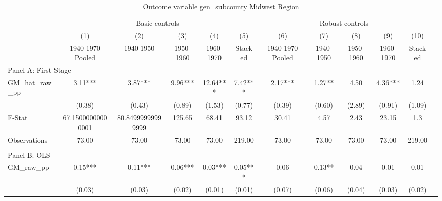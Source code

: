 \begin{table}[htbp]\centering {} \begin{threeparttable} \caption{Outcome variable gen\_subcounty Midwest Region} \begin{tabular}{l*{11}{c}} \toprule
          &\multicolumn{5}{c}{Basic controls}                                   &\multicolumn{5}{c}{Robust controls}                                  \\\cmidrule(lr){2-6}\cmidrule(lr){7-11}
          &\multicolumn{1}{c}{(1)}&\multicolumn{1}{c}{(2)}&\multicolumn{1}{c}{(3)}&\multicolumn{1}{c}{(4)}&\multicolumn{1}{c}{(5)}&\multicolumn{1}{c}{(6)}&\multicolumn{1}{c}{(7)}&\multicolumn{1}{c}{(8)}&\multicolumn{1}{c}{(9)}&\multicolumn{1}{c}{(10)}\\
          &\multicolumn{1}{c}{1940-1970 Pooled}&\multicolumn{1}{c}{1940-1950}&\multicolumn{1}{c}{1950-1960}&\multicolumn{1}{c}{1960-1970}&\multicolumn{1}{c}{Stacked}&\multicolumn{1}{c}{1940-1970 Pooled}&\multicolumn{1}{c}{1940-1950}&\multicolumn{1}{c}{1950-1960}&\multicolumn{1}{c}{1960-1970}&\multicolumn{1}{c}{Stacked}\\
\cmidrule(lr){1-11}
\multicolumn{10}{l}{Panel A: First Stage}\\
\cmidrule(lr){1-11}
GM\_hat\_raw\_pp&      3.11***&      3.87***&      9.96***&     12.64***&      7.42***&      2.17***&      1.27** &      4.50   &      4.36***&      1.24   \\
          &    (0.38)   &    (0.43)   &    (0.89)   &    (1.53)   &    (0.77)   &    (0.39)   &    (0.60)   &    (2.89)   &    (0.91)   &    (1.09)   \\
\midrule
F-Stat    &67.15000000000001   &80.84999999999999   &    125.65   &     68.41   &     93.12   &     30.41   &      4.57   &      2.43   &     23.15   &       1.3   \\
Observations&     73.00   &     73.00   &     73.00   &     73.00   &    219.00   &     73.00   &     73.00   &     73.00   &     73.00   &    219.00   \\
\cmidrule[\heavyrulewidth](lr){1-11} \\ \cmidrule[\heavyrulewidth](lr){1-11}
\multicolumn{10}{l}{Panel B: OLS}\\
\cmidrule(lr){1-11}
GM\_raw\_pp &      0.15***&      0.11***&      0.06***&      0.03***&      0.05***&      0.06   &      0.13** &      0.04   &      0.01   &      0.01   \\
          &    (0.03)   &    (0.03)   &    (0.02)   &    (0.01)   &    (0.01)   &    (0.07)   &    (0.06)   &    (0.04)   &    (0.03)   &    (0.02)   \\

\end{tabular}
\end{threeparttable}
\end{table}
